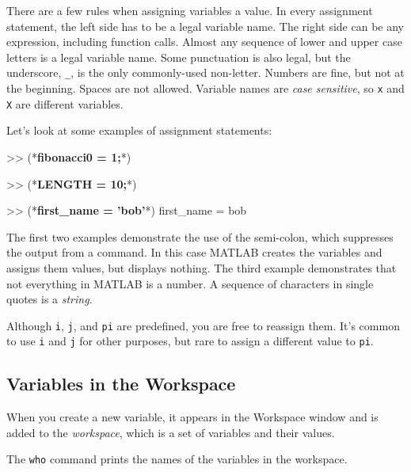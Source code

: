 There are a few rules when assigning variables a value. In every assignment statement, the left side has to be a legal variable name.  The right side can be any expression, including function calls.
Almost any sequence of lower and upper case letters is a legal
variable name.  
Some punctuation is also legal, but the underscore,
\verb"_", is the only commonly-used non-letter.
Numbers are fine, but not at the beginning.  
Spaces are not allowed.  Variable names are
\emph{case sensitive}, so \lstinline{x} and \lstinline{X} are different variables.

Let's look at some examples of assignment statements:

\begin{code}
>> (*\textbf{fibonacci0 = 1;}*)

>> (*\textbf{LENGTH = 10;}*)

>> (*\textbf{first\_name = 'bob'}*)
first_name = bob
\end{code}

The first two examples demonstrate the use of the semi-colon, which
suppresses the output from a command.  In this case MATLAB creates the
variables and assigns them values, but displays nothing.
The third example demonstrates that not everything
in MATLAB is a number.
A sequence of characters in single quotes is
a \emph{string}.


Although \lstinline{i}, \lstinline{j}, and \lstinline{pi} are predefined, you are free
to reassign them.  It's common to use \lstinline{i} and \lstinline{j} for other
purposes, but rare to assign a different value to
\lstinline{pi}.



\subsection{Variables in the Workspace}

When you create a new variable, it appears in the Workspace window and is added to the \emph{workspace}, which is a
set of variables and their values.


The \lstinline{who} command prints the
names of the variables in the workspace.

